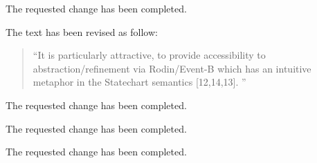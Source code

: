 \documentclass{response}
\begin{document}
\begin{response}
  The requested change has been completed.
\end{response}


\begin{comment}{Reviewer \#2}
- Page 2: line 5: "Particularly attractive is providing" --> "Particularly 
attractive in providing"
\end{comment}

\begin{response}
  The text has been revised as follow:
  \begin{quote}
    ``It is particularly attractive, to provide accessibility to abstraction/refinement via Rodin/Event-B 
    which has an intuitive metaphor in the Statechart semantics [12,14,13]. ''
  \end{quote}
\end{response}


\begin{comment}{Reviewer \#2}
- Page 2: line 10: "safety preservation" --> "safety properties preservation"
\end{comment}

\begin{response}
  The requested change has been completed.
\end{response}


\begin{comment}{Reviewer \#2}
- Page 2: line 20: "Preservation of safety" --> "Preservation of safety 
properties"
\end{comment}

\begin{response}
  The requested change has been completed.
\end{response}


\begin{comment}{Reviewer \#2}
- Page 2: line 45: "in the sense of [9]" --> "in the sense adopted by Lamport [9]"
\end{comment}

\begin{response}
  The requested change has been completed.
\end{response}



\end{document}
